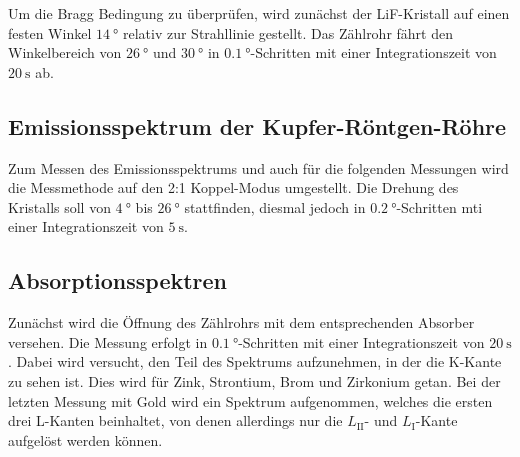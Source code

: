 Um die Bragg Bedingung zu überprüfen, wird zunächst der LiF-Kristall auf einen 
festen Winkel $\SI{14}{\degree}$ relativ zur Strahllinie gestellt. 
Das Zählrohr fährt den Winkelbereich von $\SI{26}{\degree}$ und $\SI{30}{\degree}$
in $\SI{0.1}{\degree}$-Schritten mit einer Integrationszeit von $\SI{20}{\second}$
ab. 

\subsection{Emissionsspektrum der Kupfer-Röntgen-Röhre}

Zum Messen des Emissionsspektrums und auch für die folgenden Messungen wird die 
Messmethode auf den 2:1 Koppel-Modus umgestellt. 
Die Drehung des Kristalls soll von $\SI{4}{\degree}$ bis $\SI{26}{\degree}$ 
stattfinden, diesmal jedoch in $\SI{0.2}{\degree}$-Schritten mti einer Integrationszeit
von $\SI{5}{\second}$.

\subsection{Absorptionsspektren}

Zunächst wird die Öffnung des Zählrohrs mit dem entsprechenden Absorber versehen. 
Die Messung erfolgt in $\SI{0.1}{\degree}$-Schritten mit einer Integrationszeit
von $\SI{20}{\second}$. Dabei wird versucht, den Teil des Spektrums aufzunehmen, 
in der die K-Kante zu sehen ist. 
Dies wird für Zink, Strontium, Brom und Zirkonium getan. 
Bei der letzten Messung mit Gold wird ein Spektrum aufgenommen, welches die ersten
drei L-Kanten beinhaltet, von denen allerdings nur die $L_\text{II}$- und 
$L_\text{I}$-Kante aufgelöst werden können. 